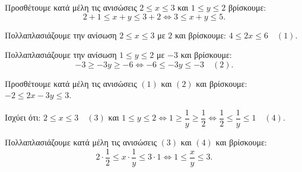 
\begin{alist}
\item Προσθέτουμε κατά μέλη τις ανισώσεις $2 \le x \le 3$ και $1 \le y \le 2$ βρίσκουμε:
\[2 + 1 \le x + y \le 3 + 2 \Leftrightarrow 3 \le x + y \le 5.\]

\item Πολλαπλασιάζουμε την ανίσωση $2 \le x \le 3$ με $2$ και βρίσκουμε: $4 \le 2x \le 6 \quad (1)$.

Πολλαπλασιάζουμε την ανίσωση $1 \le y \le 2$ με $-3$ και βρίσκουμε:
\[-3 \ge -3y \ge -6 \Leftrightarrow -6 \le -3y \le -3 \quad (2).\]

Προσθέτουμε κατά μέλη τις ανισώσεις $(1)$ και $(2)$ και βρίσκουμε:
$-2 \le 2x - 3y \le 3$.

\item Ισχύει ότι: $2 \le x \le 3 \quad (3)$ και $1 \le y \le 2 \Leftrightarrow 1 \ge \dfrac{1}{y} \ge \dfrac{1}{2} \Leftrightarrow \dfrac{1}{2} \le \dfrac{1}{y} \le 1 \quad (4)$.

Πολλαπλασιάζουμε κατά μέλη τις ανισώσεις $(3)$ και $(4)$ και βρίσκουμε:
\[2 \cdot \dfrac{1}{2} \le x \cdot \dfrac{1}{y} \le 3 \cdot 1 \Leftrightarrow 1 \le \dfrac{x}{y} \le 3.\]
\end{alist}

